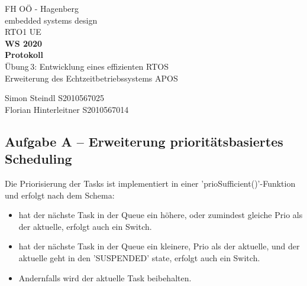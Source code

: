 \documentclass{article}
\begin{document}
\begin{titlepage}
	\begin{center}
		{\large{FH OÖ - Hagenberg \\ embedded systems design}\\\vspace*{4cm}}
		\small{RTO1 UE}\\
		\textbf{WS 2020}\\\vspace*{2cm}
		\Huge{\textbf{Protokoll}}\\\vspace*{1cm}
		\huge{Übung\,3: Entwicklung eines effizienten RTOS  \\ \large{ Erweiterung des Echtzeitbetriebssystems APOS} } \vspace*{90mm}
		
		\small{Simon Steindl  S2010567025	\\
		Florian Hinterleitner S2010567014	\\
		}
	\end{center}
\end{titlepage}

 

\subsection*{Aufgabe A – Erweiterung prioritätsbasiertes Scheduling}
Die Priorisierung der Tasks ist implementiert in einer 'prioSufficient()'-Funktion und erfolgt nach dem Schema:
\begin{itemize}
\item	hat der nächste Task in der Queue ein höhere, oder zumindest gleiche Prio als der aktuelle,  erfolgt auch ein Switch.
\item	hat der nächste Task in der Queue ein kleinere, Prio als der aktuelle, und der aktuelle geht in den 'SUSPENDED' state, erfolgt auch ein Switch.
\item Andernfalls wird der aktuelle Task beibehalten.
\end{itemize}
\end{document}
